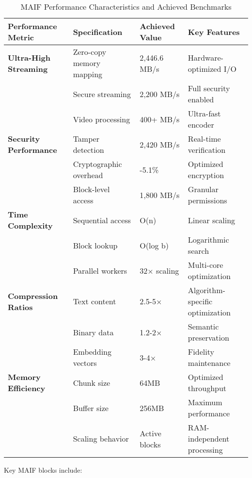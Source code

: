 \documentclass[conference]{IEEEtran}
\begin{document}
\begin{table*}[!t]
\renewcommand{\arraystretch}{1.3}
\caption{MAIF Performance Characteristics and Achieved Benchmarks}
\label{tab:performance-characteristics}
\centering
\footnotesize
\begin{tabular}{p{3.5cm}p{4cm}p{3cm}p{3.5cm}}
\toprule
\textbf{Performance Metric} & \textbf{Specification} & \textbf{Achieved Value} & \textbf{Key Features} \\
\midrule
\textbf{Ultra-High Streaming} & Zero-copy memory mapping & 2,446.6 MB/s & Hardware-optimized I/O \\
& Secure streaming & 2,200 MB/s & Full security enabled \\
& Video processing & 400+ MB/s & Ultra-fast encoder \\
\midrule
\textbf{Security Performance} & Tamper detection & 2,420 MB/s & Real-time verification \\
& Cryptographic overhead & -5.1\% & Optimized encryption \\
& Block-level access & 1,800 MB/s & Granular permissions \\
\midrule
\textbf{Time Complexity} & Sequential access & O(n) & Linear scaling \\
& Block lookup & O(log b) & Logarithmic search \\
& Parallel workers & 32× scaling & Multi-core optimization \\
\midrule
\textbf{Compression Ratios} & Text content & 2.5-5× & Algorithm-specific optimization \\
& Binary data & 1.2-2× & Semantic preservation \\
& Embedding vectors & 3-4× & Fidelity maintenance \\
\midrule
\textbf{Memory Efficiency} & Chunk size & 64MB & Optimized throughput \\
& Buffer size & 256MB & Maximum performance \\
& Scaling behavior & Active blocks & RAM-independent processing \\
\bottomrule
\end{tabular}
\end{table*}

Key MAIF blocks include:
\end{document}

